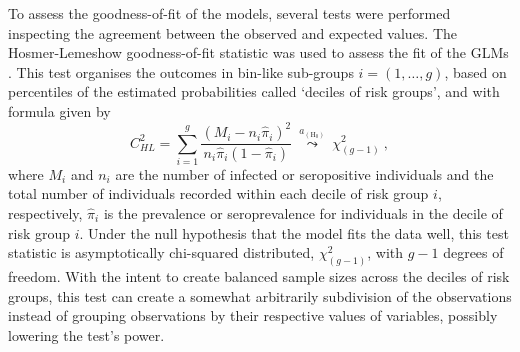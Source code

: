 To assess the goodness-of-fit of the models, several tests were performed inspecting the agreement between the observed and expected values.
The Hosmer-Lemeshow goodness-of-fit statistic was used to assess the fit of the GLMs \cite{hosmer2013applied}.
This test organises the outcomes in bin-like sub-groups $i=(1,\ldots,g)$, based on percentiles of the estimated probabilities called `deciles of risk groups', and with formula given by
%
\begin{equation}
    \label{eq:hosmer.lemeshow}
    C_{HL}^2= \sum_{i=1}^g\frac{(M_{i}-n_{i}\widehat{\pi}_{i})^2}{n_{i}\widehat{\pi}_{i}\left(1-\widehat{\pi}_{i}\right)}\ \overset{a_{\left(\text{H}_0\right)}}{\leadsto}\    \chi_{(g-1)}^{2}\ ,
\end{equation}
%
\noindent
where $M_{i}$ and $n_{i}$ are the number of infected or seropositive individuals and the total number of individuals recorded within each decile of risk group $i$, respectively, $\widehat{\pi}_{i}$ is the prevalence or seroprevalence for individuals in the decile of risk group $i$.
Under the null hypothesis that the model fits the data well, this test statistic is asymptotically chi-squared distributed, $\chi_{(g-1)}^{2}$, with $g-1$ degrees of freedom.
With the intent to create balanced sample sizes across the deciles of risk groups, this test can create a somewhat arbitrarily subdivision of the observations instead of grouping observations by their respective values of variables, possibly lowering the test's power.

